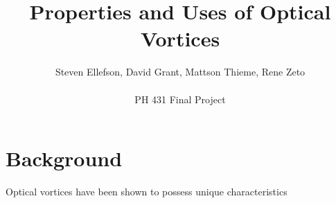 \documentclass{article}
\begin{document}
\chead{}
\title{Properties and Uses of Optical Vortices}
\author{Steven Ellefson, David Grant, Mattson Thieme, Rene Zeto\\\\PH 431 Final Project}
\maketitle

\section*{Background}
Optical vortices have been shown to possess unique characteristics
\end{document}
